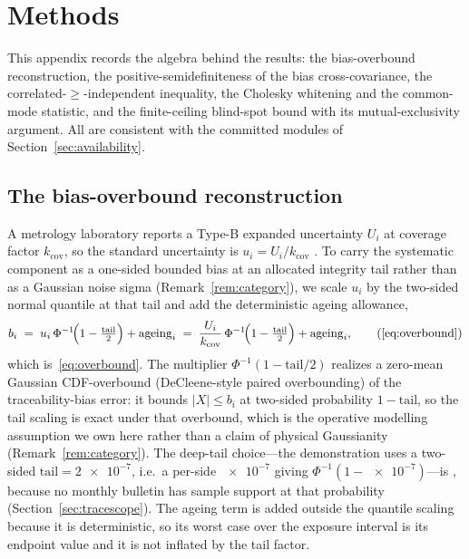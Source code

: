 \section{Methods}
\label{app:methods}

This appendix records the algebra behind the results: the bias-overbound
reconstruction, the positive-semidefiniteness of the bias cross-covariance, the
correlated-$\ge$-independent inequality, the Cholesky whitening and the
common-mode statistic, and the finite-ceiling blind-spot bound with its
mutual-exclusivity argument. All are consistent with the committed modules of
Section~\ref{sec:availability}.

\subsection{The bias-overbound reconstruction}
\label{app:overbound}

A metrology laboratory reports a Type-B expanded uncertainty $U_i$ at coverage
factor $k_{\mathrm{cov}}$, so the standard uncertainty is $u_i=U_i/k_{\mathrm{cov}}$
\citep{jcgm100}. To carry the systematic component as a one-sided bounded bias at
an allocated integrity tail rather than as a Gaussian noise sigma
(Remark~\ref{rem:category}), we scale $u_i$ by the two-sided normal quantile at that
tail and add the deterministic ageing allowance,
\begin{equation}
  b_i \;=\; u_i\,\Phi^{-1}\!\Big(1-\tfrac{\mathrm{tail}}{2}\Big)+\mathrm{ageing}_i
       \;=\; \frac{U_i}{k_{\mathrm{cov}}}\,\Phi^{-1}\!\Big(1-\tfrac{\mathrm{tail}}{2}\Big)
             +\mathrm{ageing}_i,
  \tag{\ref{eq:overbound}}
\end{equation}
which is~\eqref{eq:overbound}. The multiplier $\Phi^{-1}(1-\mathrm{tail}/2)$ realizes
a zero-mean Gaussian CDF-overbound (DeCleene-style paired overbounding) of the
traceability-bias error: it bounds $|X|\le b_i$ at two-sided probability
$1-\mathrm{tail}$, so the tail scaling is exact under that overbound, which is the
operative modelling assumption we own here rather than a claim of physical
Gaussianity (Remark~\ref{rem:category}). The deep-tail choice---the demonstration
uses a two-sided $\mathrm{tail}=\num{2e-7}$, i.e.\ a per-side $\num{e-7}$ giving
$\Phi^{-1}(1-\num{e-7})$---is \Modelled{}, because no monthly bulletin has sample
support at that probability (Section~\ref{sec:tracescope}). The ageing term is added
outside the quantile scaling because it is deterministic, so its worst case over the
exposure interval is its endpoint value and it is not inflated by the tail factor.

